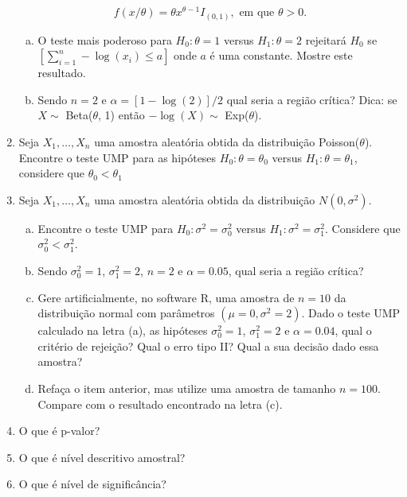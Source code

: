 \documentclass[10pt,brazil,addpoints]{exam}
\begin{document}
\begin{enumerate}[1.]
$$
f(x/\theta)=\theta x^{\theta-1} I_{(0,1)}, \mbox{ em que } \theta>0.
$$

\begin{enumerate}[a)]
\item O teste mais poderoso para $H_0: \theta=1$ versus $H_1: \theta=2$ rejeitará $H_0$ se $[\sum_{i=1}^n -\log (x_i) \leq a]$ onde $a$ é uma constante. Mostre este resultado.

\item Sendo $n=2$ e $\alpha=[1-\log(2)]/2$ qual seria a região crítica? Dica: se $X \sim$ Beta($\theta$, 1) então $-\log(X)\sim$ Exp($\theta$).
\end{enumerate}

\item Seja $X_1, \ldots, X_n$ uma amostra aleatória obtida da distribuição Poisson($\theta$). Encontre o teste UMP para as hipóteses $H_0: \theta=\theta_0$ versus $H_1: \theta=\theta_1$, considere que $\theta_0 < \theta_1$


\item Seja $X_1, \ldots, X_n$ uma amostra aleatória obtida da distribuição $N(0, \sigma^2)$.

\begin{enumerate}[a)]
\item Encontre o teste UMP para $H_0:\sigma^2=\sigma_0^2$ versus $H_1:\sigma^2=\sigma_1^2$. Considere que $\sigma_0^2< \sigma_1^2$.

\item Sendo $\sigma_0^2=1$, $\sigma^2_1=2$, $n=2$ e $\alpha=0.05$, qual seria a região crítica? 


\item Gere artificialmente, no software R, uma amostra de $n= 10$ da distribuição normal com parâmetros $(\mu=0, \sigma^2=2)$.  Dado o teste UMP calculado na letra (a), as hipóteses $\sigma_0^2=1$, $\sigma^2_1=2$ e $\alpha=0.04$, qual o critério de rejeição? Qual o erro tipo II? Qual a sua decisão dado essa amostra?

\item Refaça o item anterior, mas utilize uma amostra de tamanho $n=100$.  Compare com o resultado encontrado na letra (c).



\end{enumerate}

\item O que é p-valor?

\item O que é nível descritivo amostral? 
\item O que é nível de significância?

\end{enumerate}
\end{document}
